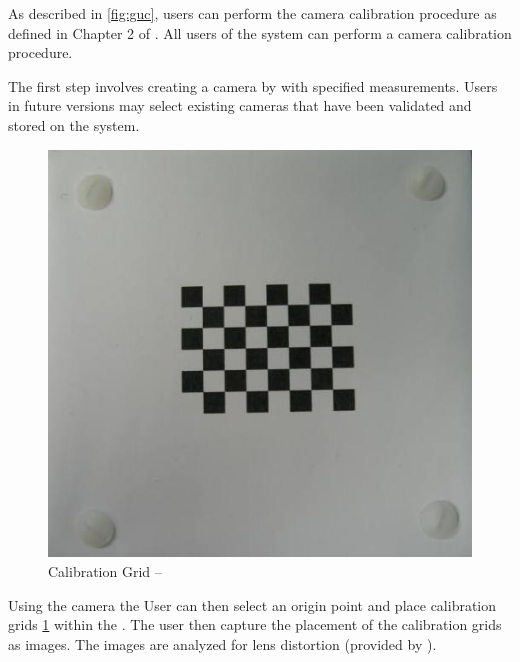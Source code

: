\documentclass[11pt]{report}
\begin{document}
As described in \ref{fig:guc}, users can perform the camera calibration procedure as defined in Chapter 2 of \cite{CC}. All users of the system can perform a camera calibration procedure. 

The first step involves creating a camera by with specified measurements. Users in future versions may select existing cameras that have been validated and stored on the system. 


\begin{figure}[htp]
\centering
\includegraphics[scale=0.45]{images/board.png}
\caption{Calibration Grid --\cite{CC}}
\label{fig:grid}
\end{figure}

Using the camera the User can then select an origin point and place calibration grids \ref{fig:grid} within the . The user then capture the placement of the calibration grids as images.
The images are analyzed for lens distortion (provided by ). 
\end{document}
